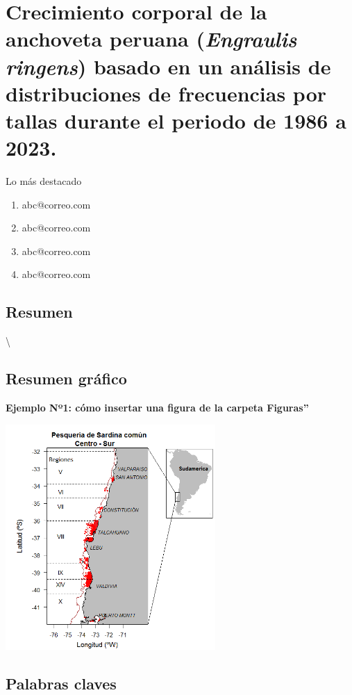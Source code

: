\documentclass[
]{article}
\author{}
\date{\vspace{-2.5em}}
\begin{document}
\pagebreak

\hypertarget{crecimiento-corporal-de-la-anchoveta-peruana-basado-en-un-anuxe1lisis-de-distribuciones-de-frecuencias-por-tallas-durante-el-periodo-de-1986-a-2023.}{%
\section{\texorpdfstring{Crecimiento corporal de la anchoveta peruana
(\textit{Engraulis ringens}) basado en un análisis de distribuciones de
frecuencias por tallas durante el periodo de 1986 a
2023.}{Crecimiento corporal de la anchoveta peruana () basado en un análisis de distribuciones de frecuencias por tallas durante el periodo de 1986 a 2023.}}\label{crecimiento-corporal-de-la-anchoveta-peruana-basado-en-un-anuxe1lisis-de-distribuciones-de-frecuencias-por-tallas-durante-el-periodo-de-1986-a-2023.}}

\author{Author One$^1$ \and Author Two$^2$}

\begin{shaded} 
Lo más destacado
\begin{enumerate}
\item abc@correo.com
\item abc@correo.com
\item abc@correo.com
\item abc@correo.com
\end{enumerate}
\end{shaded}

\hypertarget{resumen}{%
\subsection{Resumen}\label{resumen}}

\lipsum[1]\textbackslash{}

\hypertarget{resumen-gruxe1fico}{%
\subsection{Resumen gráfico}\label{resumen-gruxe1fico}}

\textbf{Ejemplo Nº1: cómo insertar una figura de la carpeta Figuras''}

\begin{center}
\includegraphics[width=0.6\textwidth]{Figuras/Figura1.png}
\end{center}

\hypertarget{palabras-claves}{%
\subsection{Palabras claves}\label{palabras-claves}}

\pagebreak
\end{document}
